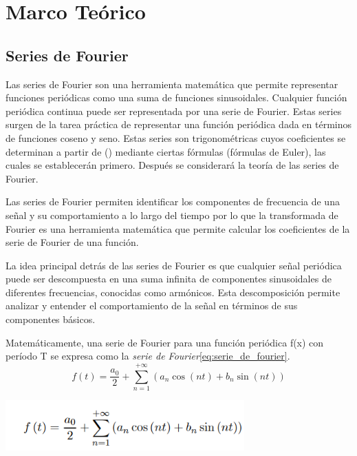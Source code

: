 \section{\texorpdfstring{Marco Teórico }{Marco Teórico }}\label{marco-teuxf3rico}

\subsection{Series de Fourier}\label{series-de-fourier}

Las series de Fourier son una herramienta matemática que permite representar funciones periódicas como una suma de funciones sinusoidales. Cualquier función periódica continua puede ser representada por una serie de Fourier. Estas series surgen de la tarea práctica de representar una función periódica dada en términos de funciones coseno y seno. Estas series son trigonométricas cuyos coeficientes se determinan a partir de () mediante ciertas fórmulas (fórmulas de Euler), las cuales se establecerán primero. Después se considerará la teoría de las series de Fourier.

Las series de Fourier permiten identificar los componentes de frecuencia de una señal y su comportamiento a lo largo del tiempo por lo que la transformada de Fourier es una herramienta matemática que permite calcular los coeficientes de la serie de Fourier de una función.

La idea principal detrás de las series de Fourier es que cualquier señal periódica puede ser descompuesta en una suma infinita de componentes sinusoidales de diferentes frecuencias, conocidas como armónicos. Esta descomposición permite analizar y entender el comportamiento de la señal en términos de sus componentes básicos.

Matemáticamente, una serie de Fourier para una función periódica f(x) con período T se expresa como la \emph{serie de Fourier}\eqref{eq:serie_de_fourier}.
\begin{equation}
	f(t) = \frac{a_0}{2} + \sum_{n=1}^{+\infty} (a_n \cos(nt) + b_n \sin(nt))	
	\label{eq:serie_de_fourier}
\end{equation}


\includegraphics[width=3.61614in,height=0.76218in]{media/image20.png}

